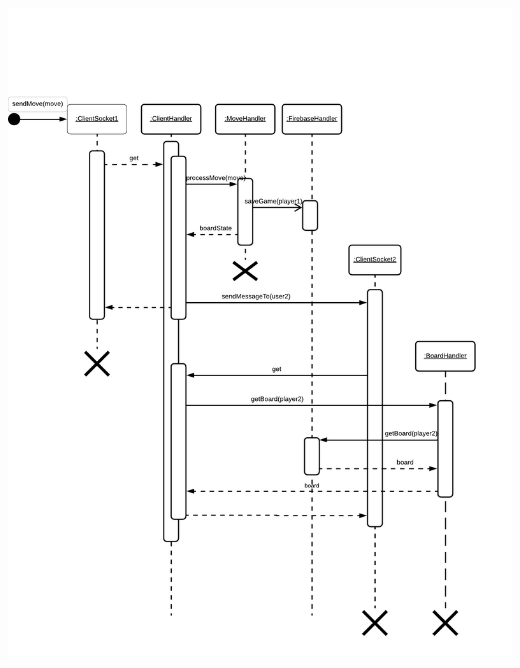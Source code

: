 \documentclass[parskip=full]{scrartcl}
\begin{document}
\begin{minipage}{\linewidth}
	\centering
	\includegraphics[width=1\linewidth]{Diagramme/ServerSequenz}
	\label{fig:sequenzdiagramm2}
\end{minipage}
	
	\printglossaries
\end{document}
